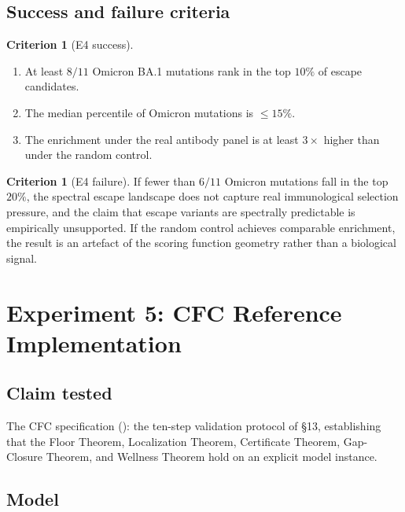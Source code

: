 \documentclass[11pt,a4paper]{article}
\theoremstyle{expthm}
\theoremstyle{definition}
\newtheorem{criterion}[theorem]{Criterion}
\theoremstyle{remark}
\begin{document}
\subsection{Success and failure criteria}

\begin{criterion}[E4 success]
\label{crit:e4-success}
\leavevmode
\begin{enumerate}[label=(\alph*),leftmargin=1.8em,itemsep=2pt]
\item At least $8/11$ Omicron BA.1 mutations rank in the top $10\%$ of
  escape candidates.
\item The median percentile of Omicron mutations is $\leq 15\%$.
\item The enrichment under the real antibody panel is at least $3\times$
  higher than under the random control.
\end{enumerate}
\end{criterion}

\begin{criterion}[E4 failure]
If fewer than $6/11$ Omicron mutations fall in the top $20\%$, the
spectral escape landscape does not capture real immunological selection
pressure, and the claim that escape variants are spectrally predictable
is empirically unsupported. If the random control achieves comparable
enrichment, the result is an artefact of the scoring function geometry
rather than a biological signal.
\end{criterion}

\section{Experiment 5: CFC Reference Implementation}
\label{sec:exp5}

\subsection{Claim tested}

The CFC specification (\citep{sachikonye2026cfc}): the ten-step
validation protocol of \S13, establishing that the Floor Theorem,
Localization Theorem, Certificate Theorem, Gap-Closure Theorem, and
Wellness Theorem hold on an explicit model instance.

\subsection{Model}
\end{document}
